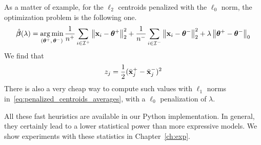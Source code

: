As a matter of example, for the $\ell_2$ centroids penalized with the $\ell_0$ norm,
the optimization problem is the following one.
\begin{equation}\label{eq:penalized_centroids_averages}
    \hat{\bm{\beta}}(\lambda) = \operatorname*{arg\,min}_{( \bm{\theta}^+,\, \bm{\theta}^-)}
        \frac{1}{n^+} \sum_{i \in \mathcal{I}^+} \big\lVert \mathbf{x}_i - \bm{\theta}^+ \big\rVert^2_2
        + \frac{1}{n^-} \sum_{i \in \mathcal{I}^-} \big\lVert \mathbf{x}_i - \bm{\theta}^- \big\rVert^2_2
        + \lambda \left\lVert\bm{\theta}^+ - \bm{\theta}^-\right\rVert_0
\end{equation}
We find that
\begin{align*}
    z_j = \frac{1}{2}(\bar{\mathbf{x}}^+_j - \bar{\mathbf{x}}^-_j)^2
\end{align*}
There is also a very cheap way to compute such values with $\ell_1$ norms in~\ref{eq:penalized_centroids_averages},
with a $\ell_0$ penalization of $\lambda$.

\bigbreak
All these fast heuristics are available in our Python implementation.
In general, they certainly lead to a lower statistical power than more expressive models.
We show experiments with these statistics in Chapter~\ref{ch:exp}.
